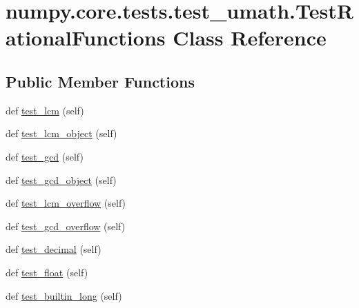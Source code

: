 \hypertarget{classnumpy_1_1core_1_1tests_1_1test__umath_1_1TestRationalFunctions}{}\section{numpy.\+core.\+tests.\+test\+\_\+umath.\+Test\+Rational\+Functions Class Reference}
\label{classnumpy_1_1core_1_1tests_1_1test__umath_1_1TestRationalFunctions}
\subsection*{Public Member Functions}
\begin{DoxyCompactItemize}
\item 
def \hyperlink{classnumpy_1_1core_1_1tests_1_1test__umath_1_1TestRationalFunctions_a517df5146d6cec446c2e0572229aecf1}{test\+\_\+lcm} (self)
\item 
def \hyperlink{classnumpy_1_1core_1_1tests_1_1test__umath_1_1TestRationalFunctions_a5b666b0ed5305f42e9fcdbe250bdd489}{test\+\_\+lcm\+\_\+object} (self)
\item 
def \hyperlink{classnumpy_1_1core_1_1tests_1_1test__umath_1_1TestRationalFunctions_ad9f32012655d8b749867268dca51ac7d}{test\+\_\+gcd} (self)
\item 
def \hyperlink{classnumpy_1_1core_1_1tests_1_1test__umath_1_1TestRationalFunctions_a90a102060d688c1128894a03a6459428}{test\+\_\+gcd\+\_\+object} (self)
\item 
def \hyperlink{classnumpy_1_1core_1_1tests_1_1test__umath_1_1TestRationalFunctions_a286f19eb12483d71ff4bff6cee472d6e}{test\+\_\+lcm\+\_\+overflow} (self)
\item 
def \hyperlink{classnumpy_1_1core_1_1tests_1_1test__umath_1_1TestRationalFunctions_aca1a1aab4167e87ebb5e0bd36ea47ea9}{test\+\_\+gcd\+\_\+overflow} (self)
\item 
def \hyperlink{classnumpy_1_1core_1_1tests_1_1test__umath_1_1TestRationalFunctions_ac832bc0fbd5fa8a3770743554eaabe46}{test\+\_\+decimal} (self)
\item 
def \hyperlink{classnumpy_1_1core_1_1tests_1_1test__umath_1_1TestRationalFunctions_a082b4ab1e7f8b27360c12796bb7ca6ec}{test\+\_\+float} (self)
\item 
def \hyperlink{classnumpy_1_1core_1_1tests_1_1test__umath_1_1TestRationalFunctions_add39b7d85c059a23084dc2e897bd55e9}{test\+\_\+builtin\+\_\+long} (self)
\end{DoxyCompactItemize}


